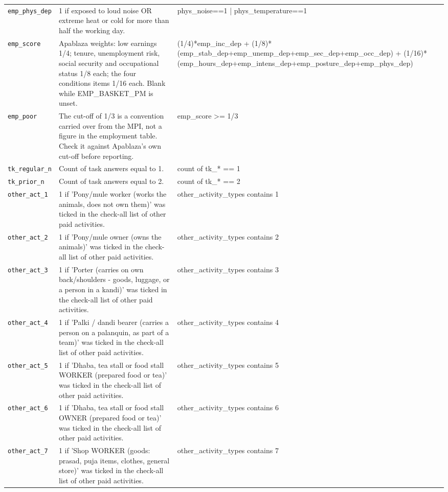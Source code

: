 \documentclass[10pt]{article}
\begin{document}
{\begin{longtable}{p{3.3cm}p{7.6cm}p{5.7cm}}
\texttt{emp\_phys\_dep} & 1 if exposed to loud noise OR extreme heat or cold for more than half the working day. & phys\_noise==1 | phys\_temperature==1 \\
\texttt{emp\_score} & Apablaza weights: low earnings 1/4; tenure, unemployment risk, social security and occupational status 1/8 each; the four conditions items 1/16 each. Blank while EMP\_BASKET\_PM is unset. & (1/4)*emp\_inc\_dep + (1/8)*(emp\_stab\_dep+emp\_unemp\_dep+emp\_sec\_dep+emp\_occ\_dep) + (1/16)*(emp\_hours\_dep+emp\_intens\_dep+emp\_posture\_dep+emp\_phys\_dep) \\
\texttt{emp\_poor} & The cut-off of 1/3 is a convention carried over from the MPI, not a figure in the employment table. Check it against Apablaza's own cut-off before reporting. & emp\_score >= 1/3 \\
\texttt{tk\_regular\_n} & Count of task answers equal to 1. & count of tk\_* == 1 \\
\texttt{tk\_prior\_n} & Count of task answers equal to 2. & count of tk\_* == 2 \\
\texttt{other\_act\_1} & 1 if 'Pony/mule worker (works the animals, does not own them)' was ticked in the check-all list of other paid activities. & other\_activity\_types contains 1 \\
\texttt{other\_act\_2} & 1 if 'Pony/mule owner (owns the animals)' was ticked in the check-all list of other paid activities. & other\_activity\_types contains 2 \\
\texttt{other\_act\_3} & 1 if 'Porter (carries on own back/shoulders - goods, luggage, or a person in a kandi)' was ticked in the check-all list of other paid activities. & other\_activity\_types contains 3 \\
\texttt{other\_act\_4} & 1 if 'Palki / dandi bearer (carries a person on a palanquin, as part of a team)' was ticked in the check-all list of other paid activities. & other\_activity\_types contains 4 \\
\texttt{other\_act\_5} & 1 if 'Dhaba, tea stall or food stall WORKER (prepared food or tea)' was ticked in the check-all list of other paid activities. & other\_activity\_types contains 5 \\
\texttt{other\_act\_6} & 1 if 'Dhaba, tea stall or food stall OWNER (prepared food or tea)' was ticked in the check-all list of other paid activities. & other\_activity\_types contains 6 \\
\texttt{other\_act\_7} & 1 if 'Shop WORKER (goods: prasad, puja items, clothes, general store)' was ticked in the check-all list of other paid activities. & other\_activity\_types contains 7 \\

\end{longtable}}
\end{document}
